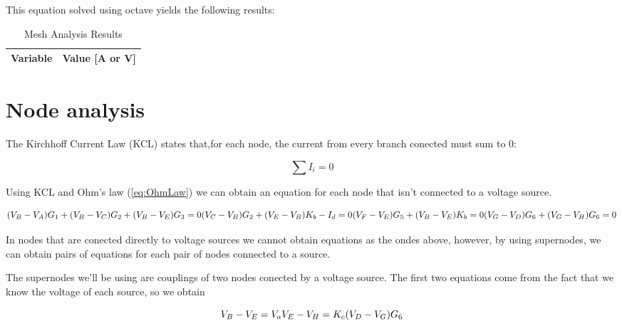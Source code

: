 This equation solved using octave yields the following results:

\begin{table}[h]
    \centering
    \begin{tabular}{|l|r|}
      \hline    
      {\bf Variable} & {\bf Value [A or V]} \\ \hline
      
    \end{tabular}
    \caption{Mesh Analysis Results}
    \label{tab:meshA}
  \end{table}

\section{Node analysis}
The Kirchhoff Current Law (KCL) states that,for each node, the current from every branch conected must sum to 0:

\begin{equation}
  \sum I_i = 0
  \label{eq:KCL}
\end{equation}


Using KCL and Ohm's law (\ref{eq:OhmLaw}) we can obtain an equation for each node that isn't connected to a voltage source.

\begin{equation}
    
  (V_B-V_A)G_1+(V_B-V_C)G_2+(V_B-V_E)G_3=0\\
  
  (V_C-V_B)G_2+(V_E-V_B)K_b-I_d=0\\
  
  (V_F-V_E)G_5+(V_B-V_E)K_b=0\\
  
  (V_G-V_D)G_6+(V_G-V_H)G_6=0\\

  \label{eq:nodos}
\end{equation}


In nodes that are conected directly to voltage sources we cannot obtain equations as the ondes above, however, by using supernodes, we can obtain pairs of equations for each pair of nodes connected to a source.
\par
The supernodes we'll be using are couplings of two nodes conected by a voltage source. The first two equations come from the fact that we know the voltage of each source, so we obtain

 \begin{equation}
    
  V_B-V_E=V_a\\
  
  V_E-V_H=K_c(V_D-V_G)G_6\\
 
  \label{eq:supenodosV}
\end{equation}

